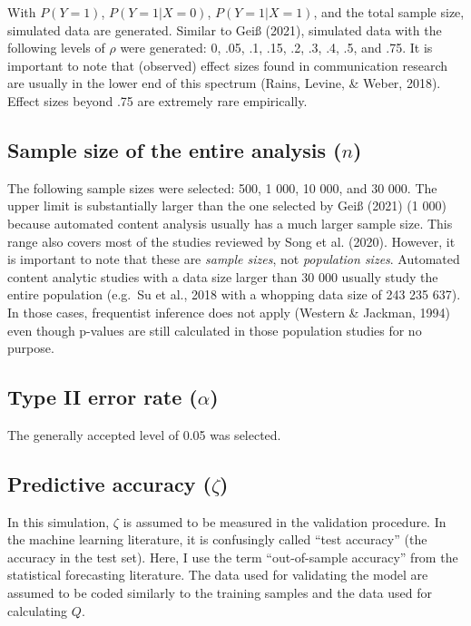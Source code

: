 \documentclass[english,man,floatsintext]{apa6}
\begin{document}
With \(P(Y=1)\), \(P(Y=1|X=0)\), \(P(Y=1|X=1)\), and the total sample size, simulated data are generated. Similar to Geiß (2021), simulated data with the following levels of \(\rho\) were generated: 0, .05, .1, .15, .2, .3, .4, .5, and .75. It is important to note that (observed) effect sizes found in communication research are usually in the lower end of this spectrum (Rains, Levine, \& Weber, 2018). Effect sizes beyond .75 are extremely rare empirically.

\hypertarget{sample-size-of-the-entire-analysis-n}{%
\subsection{\texorpdfstring{Sample size of the entire analysis (\(n\))}{Sample size of the entire analysis (n)}}\label{sample-size-of-the-entire-analysis-n}}

The following sample sizes were selected: 500, 1 000, 10 000, and 30 000. The upper limit is substantially larger than the one selected by Geiß (2021) (1 000) because automated content analysis usually has a much larger sample size. This range also covers most of the studies reviewed by Song et al. (2020). However, it is important to note that these are \emph{sample sizes}, not \emph{population sizes}. Automated content analytic studies with a data size larger than 30 000 usually study the entire population (e.g.~Su et al., 2018 with a whopping data size of 243 235 637). In those cases, frequentist inference does not apply (Western \& Jackman, 1994) even though p-values are still calculated in those population studies for no purpose.

\hypertarget{type-ii-error-rate-alpha}{%
\subsection{\texorpdfstring{Type II error rate (\(\alpha\))}{Type II error rate (\textbackslash{}alpha)}}\label{type-ii-error-rate-alpha}}

The generally accepted level of 0.05 was selected.

\hypertarget{predictive-accuracy-zeta}{%
\subsection{\texorpdfstring{Predictive accuracy (\(\zeta\))}{Predictive accuracy (\textbackslash{}zeta)}}\label{predictive-accuracy-zeta}}

In this simulation, \(\zeta\) is assumed to be measured in the validation procedure. In the machine learning literature, it is confusingly called \enquote{test accuracy} (the accuracy in the test set). Here, I use the term \enquote{out-of-sample accuracy} from the statistical forecasting literature. The data used for validating the model are assumed to be coded similarly to the training samples and the data used for calculating \(Q\).
\end{document}
